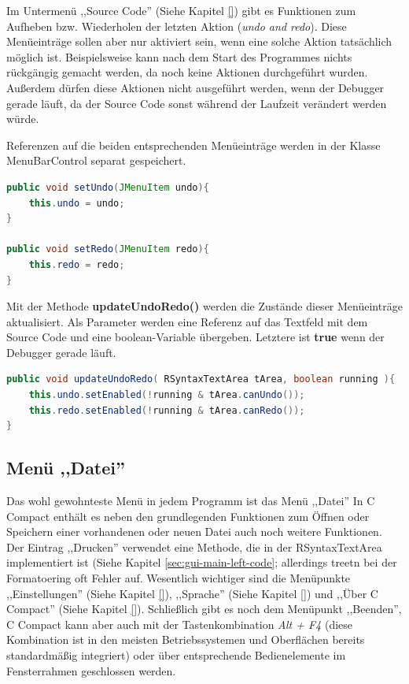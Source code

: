 Im Untermenü ,,Source Code'' (Siehe Kapitel \ref{}) gibt es Funktionen zum Aufheben bzw. Wiederholen der letzten Aktion (\emph{undo and redo}). Diese Menüeinträge sollen aber nur aktiviert sein, wenn eine solche Aktion tatsächlich möglich ist. Beispielsweise kann nach dem Start des Programmes nichts rückgängig gemacht werden, da noch keine Aktionen durchgeführt wurden. Außerdem dürfen diese Aktionen nicht ausgeführt werden, wenn der Debugger gerade läuft, da der Source Code sonst während der Laufzeit verändert werden würde.

Referenzen auf die beiden entsprechenden Menüeinträge werden in der Klasse MenuBarControl separat gespeichert.
\begin{lstlisting}[language=JAVA]
public void setUndo(JMenuItem undo){
	this.undo = undo;
}

public void setRedo(JMenuItem redo){
	this.redo = redo;
}
\end{lstlisting}

Mit der Methode \textbf{updateUndoRedo()} werden die Zustände dieser Menüeinträge aktualisiert. Als Parameter werden eine Referenz auf das Textfeld mit dem Source Code und eine boolean-Variable übergeben. Letztere ist \textbf{true} wenn der Debugger gerade läuft.
\begin{lstlisting}[language=JAVA]
public void updateUndoRedo( RSyntaxTextArea tArea, boolean running ){
	this.undo.setEnabled(!running & tArea.canUndo());
	this.redo.setEnabled(!running & tArea.canRedo());
}
\end{lstlisting}

\subsection{Menü ,,Datei''}
\label{sec:gui-main-menu-file}
Das wohl gewohnteste Menü in jedem Programm ist das Menü ,,Datei'' In C Compact enthält es neben den grundlegenden Funktionen zum Öffnen oder Speichern einer vorhandenen oder neuen Datei auch noch weitere Funktionen. Der Eintrag ,,Drucken'' verwendet eine Methode, die in der RSyntaxTextArea implementiert ist (Siehe Kapitel \ref{sec:gui-main-left-code}; allerdings treetn bei der Formatoering oft Fehler auf. Wesentlich wichtiger sind die Menüpunkte ,,Einstellungen'' (Siehe Kapitel \ref{}), ,,Sprache'' (Siehe Kapitel \ref{}) und ,,Über C Compact'' (Siehe Kapitel \ref{}). Schließlich gibt es noch dem Menüpunkt ,,Beenden'', C Compact kann aber auch mit der Tastenkombination \emph{Alt + F4} (diese Kombination ist in den meisten Betriebssystemen und Oberflächen bereits standardmäßig integriert) oder über entsprechende Bedienelemente im Fensterrahmen geschlossen werden.

